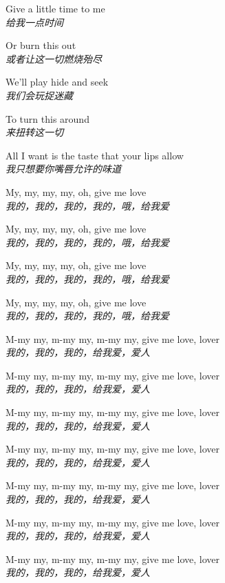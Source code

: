 \begin{spacing}{1.5}
\begin{flushleft}
Give a little time to me\\
\textit{给我一点时间}\lyricspace

Or burn this out\\
\textit{或者让这一切燃烧殆尽}\lyricspace

We'll play hide and seek\\
\textit{我们会玩捉迷藏}\lyricspace

To turn this around\\
\textit{来扭转这一切}\lyricspace

All I want is the taste that your lips allow\\
\textit{我只想要你嘴唇允许的味道}\lyricspace

My, my, my, my, oh, give me love\\
\textit{我的，我的，我的，我的，哦，给我爱}\lyricspace

My, my, my, my, oh, give me love\\
\textit{我的，我的，我的，我的，哦，给我爱}\lyricspace

My, my, my, my, oh, give me love\\
\textit{我的，我的，我的，我的，哦，给我爱}\lyricspace

My, my, my, my, oh, give me love\\
\textit{我的，我的，我的，我的，哦，给我爱}\lyricspace

M-my my, m-my my, m-my my, give me love, lover\\
\textit{我的，我的，我的，给我爱，爱人}\lyricspace

M-my my, m-my my, m-my my, give me love, lover\\
\textit{我的，我的，我的，给我爱，爱人}\lyricspace

M-my my, m-my my, m-my my, give me love, lover\\
\textit{我的，我的，我的，给我爱，爱人}\lyricspace

M-my my, m-my my, m-my my, give me love, lover\\
\textit{我的，我的，我的，给我爱，爱人}\lyricspace

M-my my, m-my my, m-my my, give me love, lover\\
\textit{我的，我的，我的，给我爱，爱人}\lyricspace

M-my my, m-my my, m-my my, give me love, lover\\
\textit{我的，我的，我的，给我爱，爱人}\lyricspace

M-my my, m-my my, m-my my, give me love, lover\\
\textit{我的，我的，我的，给我爱，爱人}\lyricspace


\end{flushleft}
\end{spacing}
